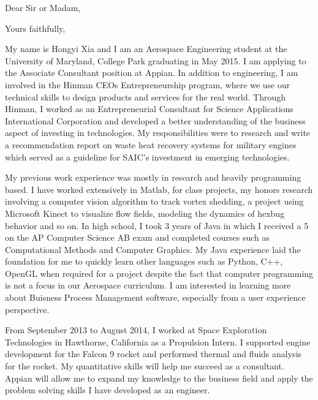 \documentclass[10pt,a4paper,sans]{moderncv}        %
\begin{document}
\date{September 20, 2014}
\opening{Dear Sir or Madam,}
\closing{Yours faithfully,}
\makelettertitle

My name is Hongyi Xia and I am an Aerospace Engineering student at the University of Maryland, College Park graduating in May 2015. I am applying to the Associate Consultant position at Appian. In addition to engineering, I am involved in the Hinman CEOs Entrepreneurship program, where we use our technical skills to design products and services for the real world. Through Hinman, I worked as an Entrepreneurial Consultant for Science Applications International Corporation and developed a better understanding of the business aspect of investing in technologies. My responsibilities were to research and write a recommendation report on waste heat recovery systems for military engines which served as a guideline for SAIC’s investment in emerging technologies.

My previous work experience was mostly in research and heavily programming based. I have worked extensively in Matlab, for class projects, my honors research involving a computer vision algorithm to track vortex shedding, a project using Microsoft Kinect to visualize flow fields, modeling the dynamics of hexbug behavior and so on. In high school, I took 3 years of Java in which I received a 5 on the AP Computer Science AB exam and completed courses such as Computational Methods and Computer Graphics. My Java experience laid the foundation for me to quickly learn other languages such as Python, C++, OpenGL when required for a project despite the fact that computer programming is not a focus in our Aerospace curriculum. I am interested in learning more about Buisness Process Management software, especially from a user experience perspective.

From September 2013 to August 2014, I worked at Space Exploration Technologies in Hawthorne, California as a Propulsion Intern. I supported engine development for the Falcon 9 rocket and performed thermal and fluids analysis for the rocket. My quantitative skills will help me succeed as a consultant. Appian will allow me to expand my knowledge to the business field and apply the problem solving skills I have developed as an engineer.



\makeletterclosing

\end{document}
